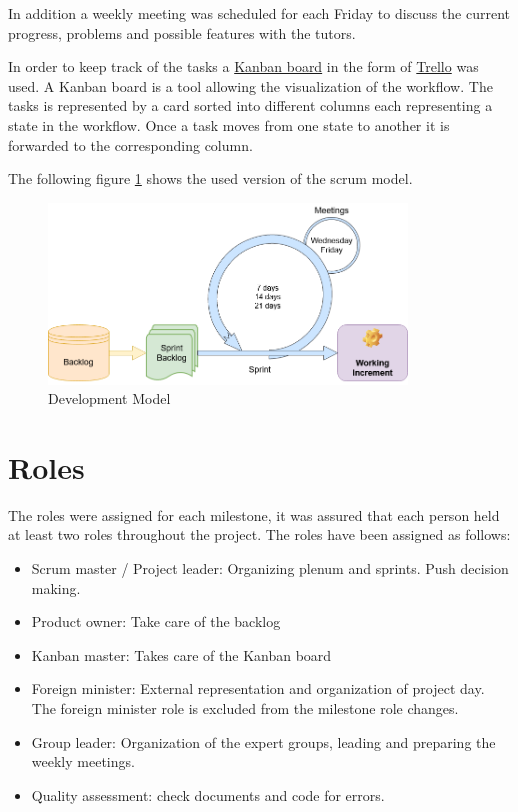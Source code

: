 \documentclass[main.tex]{subfiles}
\begin{document}
	In addition a weekly meeting was scheduled for each Friday to discuss the current progress, problems and possible features with the tutors.
	
	In order to keep track of the tasks a \href{https://www.atlassian.com/de/agile/kanban/boards}{Kanban board} in the form of \href{https://trello.com/de}{Trello} was used. A Kanban board is a tool allowing the visualization of the workflow. The tasks is represented by a card sorted into different columns each representing a state in the workflow. Once a task moves from one state to another it is forwarded to the corresponding column.
	
	The following figure \ref{developmentmodel}	shows the used version of the scrum model.
	
	\begin{figure}[h]
		\centering
		\includegraphics[width=0.85\textwidth]{pictures/diagramms/Development-model.png}
		\caption{Development Model}
		\label{developmentmodel}
	\end{figure}

	\section{Roles}
	The roles were assigned for each milestone, it was assured that each person held at least two roles throughout the project. The roles have been assigned as follows:
	\begin{itemize}
		\item Scrum master / Project leader: Organizing plenum and sprints. Push decision making.
		\item Product owner: Take care of the backlog
		\item Kanban master: Takes care of the Kanban board
		\item Foreign minister: External representation and organization of project day. The foreign minister role is excluded from the milestone role changes.
		\item Group leader: Organization of the expert groups, leading and preparing the weekly meetings.
		\item Quality assessment: check documents and code for errors.
	\end{itemize}
	
\end{document}
